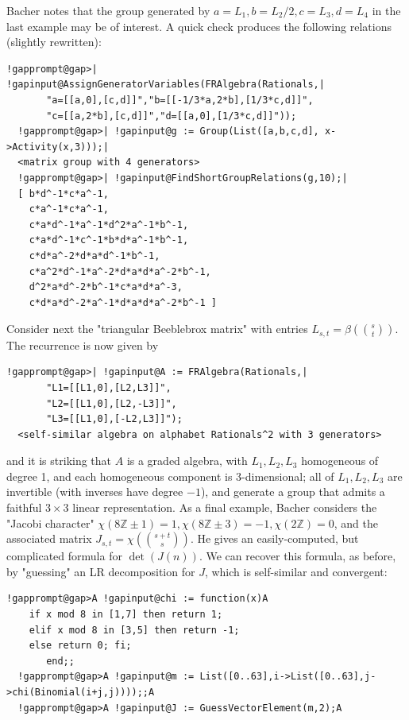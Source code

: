 \documentclass[a4paper,11pt]{report}
\begin{document}
{{ Bacher notes that the group generated by $a=L_1,b=L_2/2,c=L_3,d=L_4$ in the last example may be of interest. A quick check produces the following
relations (slightly rewritten): 
\begin{Verbatim}[commandchars=!@|,fontsize=\small,frame=single,label=Example]
  !gapprompt@gap>| !gapinput@AssignGeneratorVariables(FRAlgebra(Rationals,|
       "a=[[a,0],[c,d]]","b=[[-1/3*a,2*b],[1/3*c,d]]",
       "c=[[a,2*b],[c,d]]","d=[[a,0],[1/3*c,d]]"));
  !gapprompt@gap>| !gapinput@g := Group(List([a,b,c,d], x->Activity(x,3)));|
  <matrix group with 4 generators>
  !gapprompt@gap>| !gapinput@FindShortGroupRelations(g,10);|
  [ b*d^-1*c*a^-1,
    c*a^-1*c*a^-1,
    c*a*d^-1*a^-1*d^2*a^-1*b^-1,
    c*a*d^-1*c^-1*b*d*a^-1*b^-1,
    c*d*a^-2*d*a*d^-1*b^-1,
    c*a^2*d^-1*a^-2*d*a*d*a^-2*b^-1,
    d^2*a*d^-2*b^-1*c*a*d*a^-3,
    c*d*a*d^-2*a^-1*d*a*d*a^-2*b^-1 ]
\end{Verbatim}
 Consider next the "triangular Beeblebrox matrix" with entries $L_{s,t}=\beta({s \choose t})$. The recurrence is now given by 
\begin{Verbatim}[commandchars=!@|,fontsize=\small,frame=single,label=Example]
  !gapprompt@gap>| !gapinput@A := FRAlgebra(Rationals,|
       "L1=[[L1,0],[L2,L3]]",
       "L2=[[L1,0],[L2,-L3]]",
       "L3=[[L1,0],[-L2,L3]]");
  <self-similar algebra on alphabet Rationals^2 with 3 generators>
\end{Verbatim}
 and it is striking that $A$ is a graded algebra, with $L_1,L_2,L_3$ homogeneous of degree 1, and each homogeneous component is 3-dimensional; all
of $L_1,L_2,L_3$ are invertible (with inverses have degree $-1$), and generate a group that admits a faithful $3\times 3$ linear representation. As a final example, Bacher considers the "Jacobi
character" $\chi(8{\ensuremath{\mathbb Z}}\pm1)=1,\chi(8{\ensuremath{\mathbb
Z}}\pm3)=-1,\chi(2{\ensuremath{\mathbb Z}})=0$, and the associated matrix $J_{s,t}=\chi({s+t \choose s})$. He gives an easily-computed, but complicated formula for $\det(J(n))$. We can recover this formula, as before, by "guessing" an LR decomposition
for $J$, which is self-similar and convergent: 
\begin{Verbatim}[commandchars=!@A,fontsize=\small,frame=single,label=Example]
  !gapprompt@gap>A !gapinput@chi := function(x)A
  	if x mod 8 in [1,7] then return 1;
  	elif x mod 8 in [3,5] then return -1;
  	else return 0; fi;
       end;;
  !gapprompt@gap>A !gapinput@m := List([0..63],i->List([0..63],j->chi(Binomial(i+j,j))));;A
  !gapprompt@gap>A !gapinput@J := GuessVectorElement(m,2);A

\end{Verbatim}}}
\end{document}
